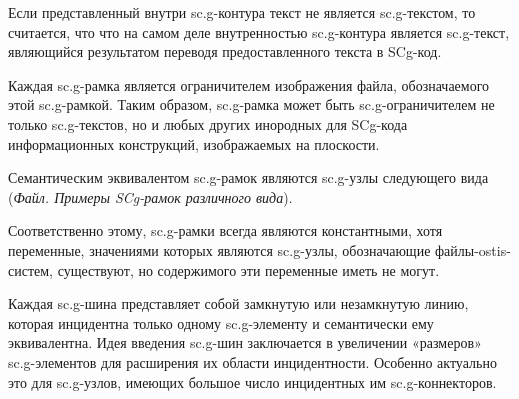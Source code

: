 \begin{SCn}
{Если представленный внутри sc.g-контура текст не является sc.g-текстом, то считается, что что на самом деле внутренностью sc.g-контура является sc.g-текст, являющийся результатом переводя предоставленного текста в SCg-код.

Каждая sc.g-рамка является ограничителем изображения файла, обозначаемого этой sc.g-рамкой. Таким образом, sc.g-рамка может быть sc.g-ограничителем не только sc.g-текстов, но и любых других инородных для SCg-кода информационных конструкций, изображаемых на плоскости.

Семантическим эквивалентом sc.g-рамок являются sc.g-узлы следующего вида (\textit{Файл. Примеры SCg-рамок различного вида}).

Соответственно этому, sc.g-рамки всегда являются константными, хотя переменные, значениями которых являются sc.g-узлы, обозначающие файлы-ostis-систем, существуют, но  содержимого эти переменные иметь не могут.

Каждая sc.g-шина представляет собой замкнутую или незамкнутую линию, которая инцидентна только одному sc.g-элементу и семантически ему эквивалентна. Идея введения sc.g-шин заключается в увеличении «размеров» sc.g-элементов для расширения их области инцидентности. Особенно актуально это для sc.g-узлов, имеющих большое число инцидентных им sc.g-коннекторов.}


\scnendstruct


\scnstartsubstruct

\bigskip
{}
\end{SCn}
